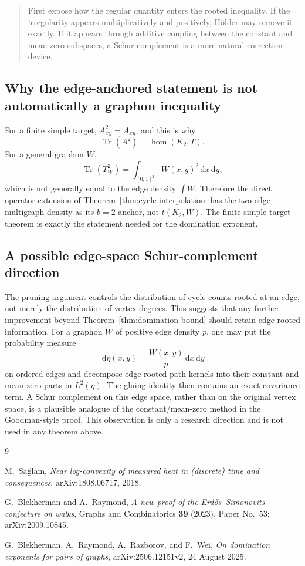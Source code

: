 \documentclass[11pt]{article}
\newcommand{\homn}{\operatorname{hom}}
\newcommand{\tr}{\operatorname{Tr}}
\newcommand{\1}{\mathbf{1}}
\newcommand{\dd}{\,\mathrm{d}}
\begin{document}
\begin{quote}
First expose how the regular quantity enters the rooted inequality.  If the
irregularity appears multiplicatively and positively, H\"older may remove it
exactly.  If it appears through additive coupling between the constant and
mean-zero subspaces, a Schur complement is a more natural correction device.
\end{quote}

\subsection{Why the edge-anchored statement is not automatically a graphon inequality}

For a finite simple target, $A_{xy}^2=A_{xy}$, and this is why
\[
  \tr(A^2)=\homn(K_2,T).
\]
For a general graphon $W$,
\[
  \tr(T_W^2)=\int_{[0,1]^2}W(x,y)^2\dd x\dd y,
\]
which is not generally equal to the edge density
$\int W$.  Therefore the direct operator extension of
Theorem~\ref{thm:cycle-interpolation} has the two-edge multigraph density as
its $b=2$ anchor, not $t(K_2,W)$.  The finite simple-target theorem is exactly
the statement needed for the domination exponent.

\subsection{A possible edge-space Schur-complement direction}

The pruning argument controls the distribution of cycle counts rooted at an
edge, not merely the distribution of vertex degrees.  This suggests that any
further improvement beyond Theorem~\ref{thm:domination-bound} should retain
edge-rooted information.  For a graphon $W$ of positive edge density $p$, one
may put the probability measure
\[
  \dd\eta(x,y)=\frac{W(x,y)}p\dd x\dd y
\]
on ordered edges and decompose edge-rooted path kernels into their constant
and mean-zero parts in $L^2(\eta)$.  The gluing identity then contains an exact
covariance term.  A Schur complement on this edge space, rather than on the
original vertex space, is a plausible analogue of the constant/mean-zero
method in the Goodman-style proof.  This observation is only a research
direction and is not used in any theorem above.

\begin{thebibliography}{9}

M.~Sa\u{g}lam,
\emph{Near log-convexity of measured heat in (discrete) time and consequences},
arXiv:1808.06717, 2018.

G.~Blekherman and A.~Raymond,
\emph{A new proof of the Erd\H{o}s--Simonovits conjecture on walks},
Graphs and Combinatorics \textbf{39} (2023), Paper No.~53;
arXiv:2009.10845.

G.~Blekherman, A.~Raymond, A.~Razborov, and F.~Wei,
\emph{On domination exponents for pairs of graphs},
arXiv:2506.12151v2, 24 August 2025.

\end{thebibliography}
\end{document}
